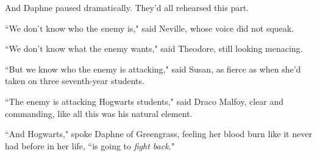 And Daphne paused dramatically. They'd all rehearsed this part.

``We don't know who the enemy is," said Neville, whose voice did not squeak.

``We don't know what the enemy wants," said Theodore, still looking menacing.

``But we know who the enemy is attacking," said Susan, as fierce as when she'd taken on three seventh-year students.

``The enemy is attacking Hogwarts students," said Draco Malfoy, clear and commanding, like all this was his natural element.

``And Hogwarts," spoke Daphne of Greengrass, feeling her blood burn like it never had before in her life, ``is going to \emph{fight back.}"

